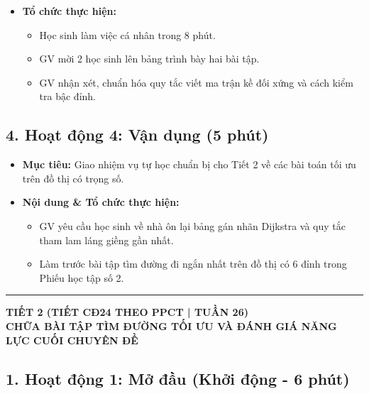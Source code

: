 \documentclass[12pt, a4paper]{article}
\begin{document}
\begin{itemize}[leftmargin=1.2cm]
    \item[d)] \textbf{Tổ chức thực hiện:}
    \begin{itemize}[leftmargin=0.6cm]
        \item Học sinh làm việc cá nhân trong 8 phút.
        \item GV mời 2 học sinh lên bảng trình bày hai bài tập.
        \item GV nhận xét, chuẩn hóa quy tắc viết ma trận kề đối xứng và cách kiểm tra bậc đỉnh.
    \end{itemize}
\end{itemize}

\subsection*{4. Hoạt động 4: Vận dụng (5 phút)}

\begin{itemize}[leftmargin=1.2cm]
    \item[a)] \textbf{Mục tiêu:} Giao nhiệm vụ tự học chuẩn bị cho Tiết 2 về các bài toán tối ưu trên đồ thị có trọng số.
    \item[b)] \textbf{Nội dung & Tổ chức thực hiện:}
    \begin{itemize}[leftmargin=0.6cm]
        \item GV yêu cầu học sinh về nhà ôn lại bảng gán nhãn Dijkstra và quy tắc tham lam láng giềng gần nhất.
        \item Làm trước bài tập tìm đường đi ngắn nhất trên đồ thị có 6 đỉnh trong Phiếu học tập số 2.
    \end{itemize}
\end{itemize}

\vspace{10pt}
\hrule
\vspace{10pt}

\begin{center}
    \textbf{\large TIẾT 2 (TIẾT CĐ24 THEO PPCT | TUẦN 26)}\\[4pt]
    \textbf{\large CHỮA BÀI TẬP TÌM ĐƯỜNG TỐI ƯU VÀ ĐÁNH GIÁ NĂNG LỰC CUỐI CHUYÊN ĐỀ}
\end{center}

\subsection*{1. Hoạt động 1: Mở đầu (Khởi động - 6 phút)}
\end{document}
